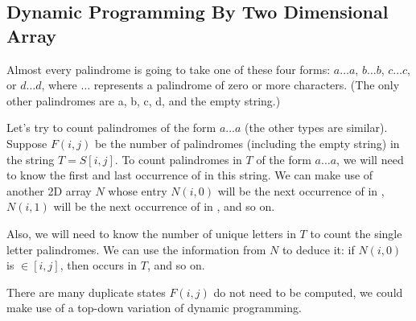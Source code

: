 \subsection{Dynamic Programming By Two Dimensional Array}
Almost every palindrome is going to take one of these four forms: $a\ldots a$, $b\ldots b$, $c\ldots c$, or $d\ldots d$, where $\ldots$ represents a palindrome of zero or more characters. (The only other palindromes are a, b, c, d, and the empty string.)

Let's try to count palindromes of the form $a\ldots a$ (the other types are similar). Suppose $F(i, j)$ be the number of palindromes (including the empty string) in the string $T = S[i, j]$. To count palindromes in $T$ of the form $a\ldots a$, we will need to know the first and last occurrence of  in this string. We can make use of another 2D array $N$ whose entry $N(i,0)$ will be the next occurrence of  in , $N(i,1)$ will be the next occurrence of  in , and so on.

Also, we will need to know the number of unique letters in $T$ to count the single letter palindromes. We can use the information from $N$ to deduce it: if $N(i,0)$ is $\in [i, j]$, then  occurs in $T$, and so on.

There are many duplicate states $F(i,j)$ do not need to be computed, we could make use of a top-down variation of dynamic programming.